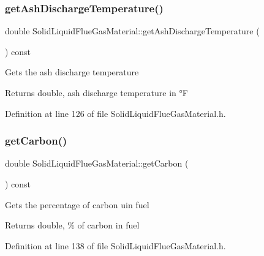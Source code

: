 \subsubsection{\texorpdfstring{get\+Ash\+Discharge\+Temperature()}{getAshDischargeTemperature()}}
{\footnotesize\ttfamily double Solid\+Liquid\+Flue\+Gas\+Material\+::get\+Ash\+Discharge\+Temperature (\begin{DoxyParamCaption}{ }\end{DoxyParamCaption}) const\hspace{0.3cm}{\ttfamily [inline]}}

Gets the ash discharge temperature \begin{DoxyReturn}{Returns}
double, ash discharge temperature in °F 
\end{DoxyReturn}


Definition at line 126 of file Solid\+Liquid\+Flue\+Gas\+Material.\+h.

\mbox{\label{class_solid_liquid_flue_gas_material_a7b8a98111943d30094e2d6950f7f2ec1}} 
\subsubsection{\texorpdfstring{get\+Carbon()}{getCarbon()}}
{\footnotesize\ttfamily double Solid\+Liquid\+Flue\+Gas\+Material\+::get\+Carbon (\begin{DoxyParamCaption}{ }\end{DoxyParamCaption}) const\hspace{0.3cm}{\ttfamily [inline]}}

Gets the percentage of carbon uin fuel \begin{DoxyReturn}{Returns}
double, \% of carbon in fuel 
\end{DoxyReturn}


Definition at line 138 of file Solid\+Liquid\+Flue\+Gas\+Material.\+h.

\mbox{\label{class_solid_liquid_flue_gas_material_a8757b831e5a2ef26dbb0cf271c0e8207}} 
